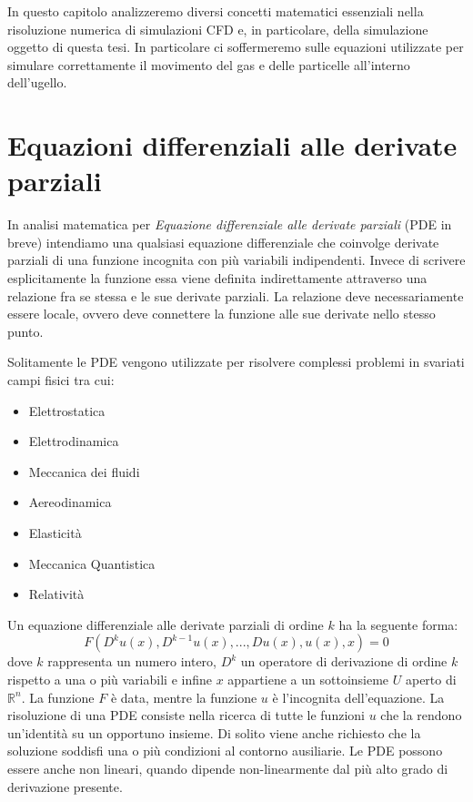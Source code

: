 In questo capitolo analizzeremo diversi concetti matematici essenziali nella risoluzione numerica di simulazioni CFD e,
in particolare, della simulazione oggetto di questa tesi. In particolare ci soffermeremo sulle equazioni utilizzate
per simulare correttamente il movimento del gas e delle particelle all'interno dell'ugello.

\section{Equazioni differenziali alle derivate parziali}\label{PDE}
In analisi matematica per \textit{Equazione differenziale alle derivate parziali} (PDE in breve) intendiamo una qualsiasi equazione differenziale
che coinvolge derivate parziali di una funzione incognita con più variabili indipendenti.
Invece di scrivere esplicitamente la funzione essa viene definita indirettamente attraverso una relazione fra se stessa
e le sue derivate parziali. La relazione deve necessariamente essere locale, ovvero deve connettere la funzione alle sue derivate nello stesso punto.

Solitamente le PDE vengono utilizzate per risolvere complessi problemi in svariati campi fisici tra cui:
\begin{itemize}
    \item Elettrostatica
    \item Elettrodinamica
    \item Meccanica dei fluidi
    \item Aereodinamica
    \item Elasticità
    \item Meccanica Quantistica
    \item Relatività
\end{itemize}

Un equazione differenziale alle derivate parziali di ordine \(k\) ha la seguente forma:
\begin{equation}
    F(D^ku(x),D^{k-1}u(x),...,Du(x),u(x),x)=0
\end{equation}
dove \(k\) rappresenta un numero intero, \(D^k\) un operatore di derivazione di ordine \(k\) rispetto a una o più variabili e infine
\(x\) appartiene a un sottoinsieme \(U\) aperto di $\mathbb{R}^n$.
La funzione \(F\) è data, mentre la funzione \(u\) è l'incognita dell'equazione.
La risoluzione di una PDE consiste nella ricerca di tutte le funzioni \(u\) che la rendono un'identità su un opportuno insieme.
Di solito viene anche richiesto che la soluzione soddisfi una o più condizioni al contorno ausiliarie.
Le PDE possono essere anche non lineari, quando dipende non-linearmente dal più alto grado di derivazione presente.
